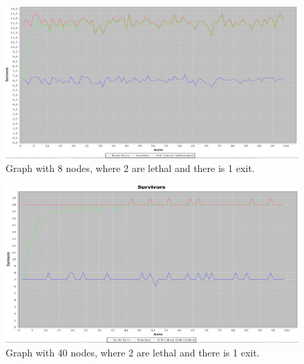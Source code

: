 \begin{figure} %
\includegraphics[width=160mm]{Float8Nodes2Leathal1Exitpng.png}
\caption{Graph with 8 nodes, where 2 are lethal and there is 1 exit.}
\label{Rsmalgraph}
\end{figure}

\begin{figure} %
\includegraphics[width=160mm]{40Nodes2Leathal2Exit.png}
\caption{Graph with 40 nodes, where 2 are lethal and there is 1 exit.}
\label{Rbiggraph}
\end{figure}


